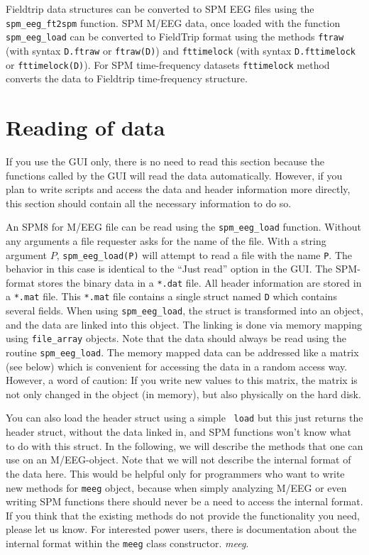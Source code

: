 Fieldtrip data structures can be converted to SPM EEG files using the \texttt{spm\_eeg\_ft2spm} function. SPM M/EEG data, once loaded with the function \texttt{spm\_eeg\_load} can be converted to FieldTrip format using the methods \texttt{ftraw} (with syntax \texttt{D.ftraw} or \texttt{ftraw(D)}) and \texttt{fttimelock} (with syntax \texttt{D.fttimelock} or \texttt{fttimelock(D)}). For SPM time-frequency datasets \texttt{fttimelock} method converts the data to Fieldtrip time-frequency structure.

\section{Reading of data\label{sec:load}}
If you use the GUI only, there is no need to read this section because the functions called by the GUI will read the data automatically. However, if you plan to write scripts and access the data and header information more directly, this section should contain all the necessary information to do so.

An SPM8 for M/EEG file can be read using the \texttt{spm\_eeg\_load} function. Without any arguments a file requester asks for the name of the file. With a string argument $P$, \texttt{spm\_eeg\_load(P)} will attempt to read a file with the name \texttt{P}. The behavior in this case is identical to the ``Just read'' option in the GUI. The SPM-format stores the binary data in a \texttt{*.dat} file. All header information are stored in a \texttt{*.mat} file. This \texttt{*.mat} file contains a single struct named \texttt{D} which contains several fields. When using \texttt{spm\_eeg\_load}, the struct is transformed into an object, and the data are linked into this object. The linking is done via memory mapping using \texttt{file\_array} objects. Note that the data should always be read using the routine \texttt{spm\_eeg\_load}. The memory mapped data can be addressed like a matrix (see below) which is convenient for accessing the data in a random access way. However, a word of caution: If you write new values to this matrix, the matrix is not only changed in the object (in memory), but also physically on the hard disk.

You can also load the header struct using a simple \matlab\ \texttt{load} but this just returns the header struct, without the data linked in, and SPM functions won't know what to do with this struct. In the following, we will describe the methods that one can use on an M/EEG-object. Note that we will not describe the internal format of the data here. This would be helpful only for programmers who want to write new methods for \texttt{meeg} object, because when simply analyzing M/EEG or even writing SPM functions there should never be a need to access the internal format. If you think that the existing methods do not provide the functionality you need, please let us know. For interested power users, there is documentation about the internal format within the \texttt{meeg} class constructor.
\textit{meeg}.

